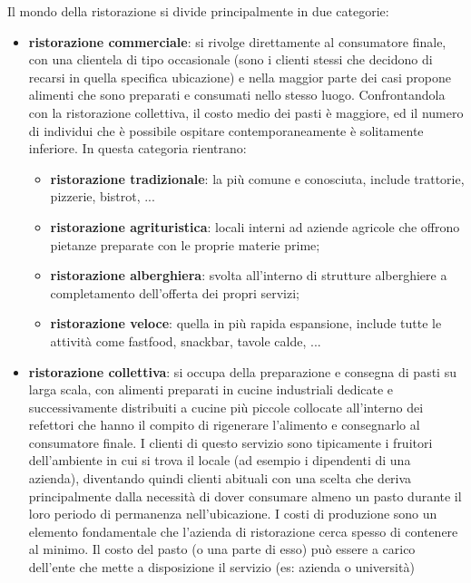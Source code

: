 \documentclass[a4paper, titlepage, 12pt, openright, oneside]{book}
\begin{document}
Il mondo della ristorazione si divide principalmente in due categorie:
\begin{itemize}
	\item \textbf{ristorazione commerciale}: si rivolge direttamente al consumatore finale, con una clientela di tipo occasionale
											 (sono i clienti stessi che decidono di recarsi in quella specifica ubicazione) e nella maggior parte dei casi
											 propone alimenti che sono preparati e consumati nello stesso luogo. Confrontandola con la ristorazione collettiva,
											 il costo medio dei pasti è maggiore, ed il numero di individui che è possibile ospitare contemporaneamente è solitamente inferiore.
											 In questa categoria rientrano:
											 \begin{itemize}
											 	\item \textbf{ristorazione tradizionale}: la più comune e conosciuta, include trattorie, pizzerie, bistrot, ...
											 	\item \textbf{ristorazione agrituristica}: locali interni ad aziende agricole che offrono pietanze preparate con le proprie materie prime;
											 	\item \textbf{ristorazione alberghiera}: svolta all'interno di strutture alberghiere a completamento dell'offerta dei propri servizi;
											 	\item \textbf{ristorazione veloce}: quella in più rapida espansione, include tutte le attività 
											 										come fastfood, snackbar, tavole calde, ...
											 \end{itemize}
	\item \textbf{ristorazione collettiva}: si occupa della preparazione e consegna di pasti su larga scala, con alimenti preparati in cucine industriali dedicate e
											successivamente distribuiti a cucine più piccole collocate all'interno dei refettori che hanno il compito di rigenerare l'alimento
											e consegnarlo al consumatore finale. I clienti di questo servizio sono tipicamente i fruitori dell'ambiente in cui si trova il locale
											(ad esempio i dipendenti di una azienda), diventando quindi clienti abituali con una scelta che deriva principalmente 
											dalla necessità di dover consumare almeno un pasto durante il loro periodo di permanenza nell'ubicazione. 
											I costi di produzione sono un elemento fondamentale che l'azienda di ristorazione cerca spesso di contenere al minimo.
											Il costo del pasto (o una parte di esso) può essere a carico dell'ente che mette a disposizione il servizio (es: azienda o università)

\end{itemize}
\end{document}
